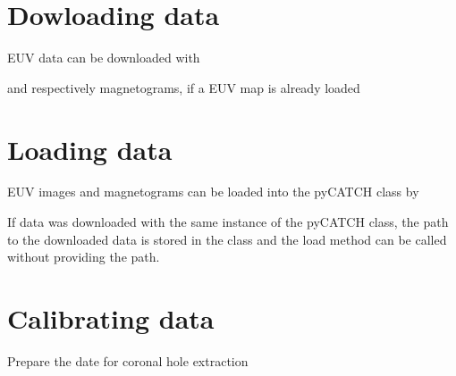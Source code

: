 \documentclass[letterpaper,10pt,english]{sphinxmanual}
\begin{document}
\section{Dowloading data}
\label{\detokenize{getting_started:dowloading-data}}
\sphinxAtStartPar
EUV data can be downloaded with

\begin{sphinxVerbatim}[commandchars=\\\{\}]
\end{sphinxVerbatim}

\sphinxAtStartPar
and respectively magnetograms, if a EUV map is already loaded

\begin{sphinxVerbatim}[commandchars=\\\{\}]
\end{sphinxVerbatim}


\section{Loading data}
\label{\detokenize{getting_started:loading-data}}
\sphinxAtStartPar
EUV images and magnetograms can be loaded into the pyCATCH class by

\begin{sphinxVerbatim}[commandchars=\\\{\}]
    
\end{sphinxVerbatim}

\sphinxAtStartPar
If data was downloaded with the same instance of the pyCATCH class, the path to the downloaded data is stored in the class and the load method can be called without providing the path.


\section{Calibrating data}
\label{\detokenize{getting_started:calibrating-data}}
\sphinxAtStartPar
Prepare the date for coronal hole extraction
\end{document}
